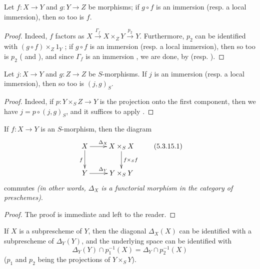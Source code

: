 \begin{corollary}[5.3.13]
\label{1.5.3.13}
Let $f:X\to Y$ and $g:Y\to Z$ be morphisms;
if $g\circ f$ is an immersion (resp. a local immersion), then so too is $f$.
\end{corollary}

\begin{proof}
\label{proof-1.5.3.13}
Indeed, $f$ factors as $X\xrightarrow{\Gamma_f}X\times_Z Y\xrightarrow{p_2}Y$.
Furthermore, $p_2$ can be identified with $(g\circ f)\times_Z 1_Y$ ;
if $g\circ f$ is an immersion (resp. a local immersion), then so too is $p_2$ ( and ), and since $\Gamma_f$ is an immersion , we are done, by  (resp. ).
\end{proof}

\begin{corollary}[5.3.14]
\label{1.5.3.14}
Let $j:X\to Y$ and $g:Z\to Z$ be $S$-morphisms.
If $j$ is an immersion (resp. a local immersion), then so too is $(j,g)_S$.
\end{corollary}

\begin{proof}
\label{proof-1.5.3.14}
Indeed, if $p:Y\times_S Z\to Y$ is the projection onto the first component, then we have $j=p\circ(j,g)_S$, and it suffices to apply .
\end{proof}

\begin{proposition}[5.3.15]
\label{1.5.3.15}
If $f:X\to Y$ is an $S$-morphism, then the diagram
\[
\label{1.5.3.15.1}
  \xymatrix{
    X\ar[r]^{\Delta_X}\ar[d]_f &
    X\times_S X\ar[d]^{f\times_S f}\\
    Y\ar[r]^{\Delta_Y} &
    Y\times_S Y
  }\tag{5.3.15.1}
\]
commutes \emph{(in other words, $\Delta_X$ is a functorial morphism in the category of preschemes)}.
\end{proposition}

\begin{proof}
\label{proof-1.5.3.15}
The proof is immediate and left to the reader.
\end{proof}

\begin{corollary}[5.3.16]
\label{1.5.3.16}
If $X$ is a subprescheme of $Y$, then the diagonal $\Delta_X(X)$ can be identified with a subprescheme of $\Delta_Y(Y)$, and the underlying space can be identified with
\[
  \Delta_Y(Y)\cap p_1^{-1}(X)=\Delta_Y\cap p_2^{-1}(X)
\]
($p_1$ and $p_2$ being the projections of $Y\times_S Y$).
\end{corollary}

